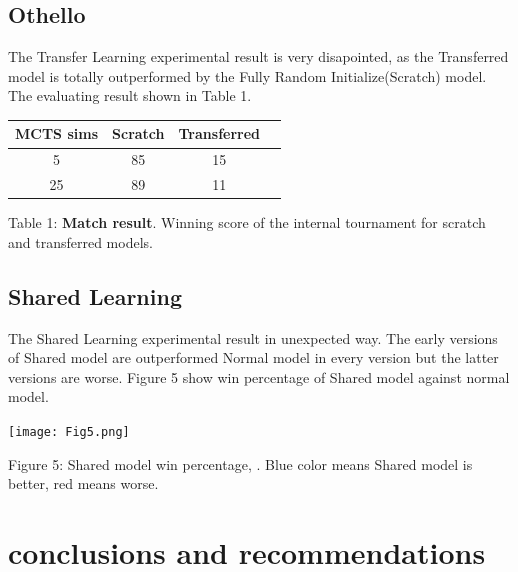 \documentclass[12pt,a4paper]{article}
\begin{document}
\subsection{Othello}
\hspace{0.6cm}The Transfer Learning experimental result is very disapointed, as the Transferred model is totally outperformed by the Fully Random Initialize(Scratch) model. The evaluating result shown in Table 1.
{
\begin{center}
\begin{tabular}{ |c|c|c|c| }
\hline
MCTS sims & Scratch & Transferred \\
\hline
5         & 85      & 15           \\
\hline
25        & 89      & 11           \\
\hline
\end{tabular}\par
\begin{small}
Table 1: \textbf{Match result}. Winning score of the internal tournament for scratch and transferred models.
\end{small}
\end{center}
}
\subsection{Shared Learning}
\hspace{0.6cm}The Shared Learning experimental result in unexpected way. The early versions of Shared model are outperformed Normal model in every version but the latter versions are worse. Figure 5 show win percentage of Shared model against normal model.
\clearpage
\begin{center}
\texttt{[image: Fig5.png]}\par
\begin{small}
Figure 5: Shared model win percentage, . Blue color means Shared model is better, red means worse.
\end{small}
\end{center}
\clearpage
\section{conclusions and recommendations}
\clearpage


\end{document}
